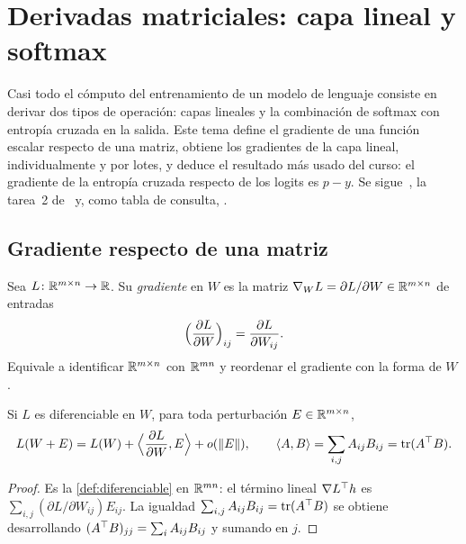 \chapter{Derivadas matriciales: capa lineal y softmax}
\label{tema:3}

Casi todo el cómputo del entrenamiento de un modelo de lenguaje consiste en derivar dos tipos de operación: capas lineales y la combinación de softmax con entropía cruzada en la salida. Este tema define el gradiente de una función escalar respecto de una matriz, obtiene los gradientes de la capa lineal, individualmente y por lotes, y deduce el resultado más usado del curso: el gradiente de la entropía cruzada respecto de los logits es $p-y$. Se sigue~\cite[§5.3--§5.5]{mml}, la tarea~2 de~\cite{cs224n} y, como tabla de consulta, \cite{cookbook}.

\section{Gradiente respecto de una matriz}

\begin{definicion}\label{def:grad-matriz}
Sea $L\colon\mathbb{R}^{m\times n}\to\mathbb{R}$. Su \emph{gradiente} en $W$ es la matriz $\nabla_W L=\partial L/\partial W\in\mathbb{R}^{m\times n}$ de entradas
\[
\Bigl(\frac{\partial L}{\partial W}\Bigr)_{ij}=\frac{\partial L}{\partial W_{ij}}.
\]
Equivale a identificar $\mathbb{R}^{m\times n}$ con $\mathbb{R}^{mn}$ y reordenar el gradiente con la forma de $W$.
\end{definicion}

\begin{proposicion}\label{prop:frobenius}
Si $L$ es diferenciable en $W$, para toda perturbación $E\in\mathbb{R}^{m\times n}$,
\[
L(W+E)=L(W)+\Bigl\langle\frac{\partial L}{\partial W},E\Bigr\rangle+o(\lVert E\rVert),\qquad
\langle A,B\rangle=\sum_{i,j}A_{ij}B_{ij}=\operatorname{tr}(A^{\top} B).
\]
\end{proposicion}

\begin{proof}
Es la \cref{def:diferenciable} en $\mathbb{R}^{mn}$: el término lineal $\nabla L^{\top} h$ es $\sum_{i,j}(\partial L/\partial W_{ij})E_{ij}$. La igualdad $\sum_{i,j}A_{ij}B_{ij}=\operatorname{tr}(A^{\top} B)$ se obtiene desarrollando $(A^{\top} B)_{jj}=\sum_i A_{ij}B_{ij}$ y sumando en $j$.
\end{proof}

